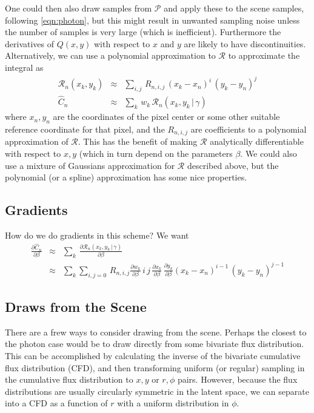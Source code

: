 \documentclass[modern]{aastex62}
\newcommand{\given}{\,|\,}
\newcommand{\countrate}{\hat{C}}
\newcommand{\psf}{\mathcal{P}}
\newcommand{\prf}{\mathcal{R}}
\newcommand{\qe}{Q}
\begin{document}
{One could then also draw samples from $\psf$ and apply these to the scene samples, following \ref{eqn:photon},
 but this might result in unwanted sampling noise unless the number of samples is very large (which is inefficient).
Furthermore the derivatives of $\qe(x, y)$ with respect to $x$ and $y$ are likely to have discontinuities.
Alternatively, we can use a polynomial approximation to $\prf$ to approximate the integral as
\begin{eqnarray}
\prf_n(x_k, y_k) & \approx & \sum_{i,j} \, R_{n, i, j} \, (x_k - x_n)^i \, (y_k - y_n)^j \\
\countrate_n & \approx & \sum_k \, w_k \, \prf_n(x_k, y_k \given \gamma) \nonumber
\end{eqnarray}
where $x_n, y_n$ are the coordinates of the pixel center or some other suitable reference coordinate for that pixel, 
and the $R_{n,i,j}$ are coefficients to a polynomial approximation of $\prf$.
This has the benefit of making $\prf$ analytically differentiable with respect to $x, y$ (which in turn depend on the parameters $\beta$.
We could also use a mixture of Gaussians approximation for $\prf$ described above, but the polynomial  (or a spline) approximation has some nice properties.


\subsection{Gradients}
How do we do gradients in this scheme?  We want 
\begin{eqnarray}
\frac{\partial\countrate_n}{\partial\beta} & \approx & \sum_k \, \frac{\partial\prf_n(x_k, y_k \given \gamma)}{\partial \beta} \nonumber \\
& \approx & \sum_k\sum_{i,j=0} \, R_{n, i, j} \frac{\partial w_k}{\partial \beta}\, i \, j \, \frac{\partial x_k}{\partial \beta}\, \frac{\partial y_k}{\partial \beta} (x_k - x_n)^{i-1} \, (y_k - y_n)^{j-1}
\end{eqnarray}


\subsection{Draws from the Scene}
There are a frew ways to consider drawing from the scene.
Perhaps the closest to the photon case would be to draw directly from some bivariate flux distribution.
This can be accomplished by calculating the inverse of the bivariate cumulative flux distribution (CFD),
 and then transforming uniform (or regular) sampling in the cumulative flux distribution to $x, y$ or $r, \phi$ pairs.
However, because the flux distributions are usually circularly symmetric in the latent space, we can separate into a CFD as a function of $r$ with a uniform distribution in $\phi$.

}
\end{document}
